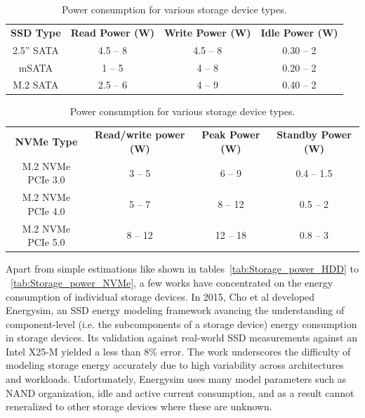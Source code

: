 \begin{table}[H]
    \begin{subtable}[t]{\textwidth}
        \centering
        \begin{tabular}{ |c|c|c|c| } 
            \hline
            \textbf{SSD Type} & \textbf{Read Power (W)} & \textbf{Write Power (W)} & \textbf{Idle Power (W)} \\
            \Xhline{1.5pt}
            2.5'' SATA & 4.5 -- 8 & 4.5 -- 8 & 0.30 -- 2 \\
            \hline
            mSATA & 1 -- 5 & 4 -- 8 & 0.20 -- 2 \\
            \hline
            M.2 SATA & 2.5 -- 6 & 4 -- 9 & 0.40 -- 2 \\
            \hline
        \end{tabular}
        \caption[Typical SATA SSD power consumption]{Typical SATA SSD power consumption\parencite{storedbits_ssd}}
        \label{tab:Storage_power_SSD}
    \end{subtable}

    \vspace{1em}

    \begin{subtable}[t]{\textwidth}
        \centering
        \begin{tabular}{ |c|c|c|c| } 
            \hline
            \textbf{NVMe Type} & \textbf{Read/write power (W)} & \textbf{Peak Power (W)} & \textbf{Standby Power (W)} \\
            \Xhline{1.5pt}
            M.2 NVMe PCIe 3.0 & 3 -- 5 & 6 -- 9 & 0.4 -- 1.5 \\
            \hline
            M.2 NVMe PCIe 4.0 & 5 -- 7 & 8 -- 12 & 0.5 -- 2 \\
            \hline
            M.2 NVMe PCIe 5.0 & 8 -- 12 & 12 -- 18 & 0.8 -- 3 \\
            \hline
        \end{tabular}
        \caption[Typical NVMe SSD power consumption]{Typical NVMe SSD power consumption\parencite{storedbits_ssd}}
        \label{tab:Storage_power_NVMe}
    \end{subtable}

    \caption[Power consumption for storage types]{Power consumption for various storage device types.}
    \label{tab:Storage_power_grouped}
\end{table}

Apart from simple estimations like shown in tables~\ref{tab:Storage_power_HDD} to ~\ref{tab:Storage_power_NVMe}, a few works have concentrated on the energy consumption of individual storage devices. In 2015, Cho et al developed Energysim\parencite{choDesignTradeoffsSSDs2015}, an SSD energy modeling framework avancing the understanding of component-level (i.e. the subcomponents of a storage device) energy consumption in storage devices. Its validation against real-world SSD measurements against an Intel X25-M yielded a less than 8\% error. The work underscores the difficulty of modeling storage energy accurately due to high variability across architectures and workloads. Unfortunately, Energysim uses many model parameters such as NAND organization, idle and active current consumption, and as a result cannot reneralized to other storage devices where these are unknown.

